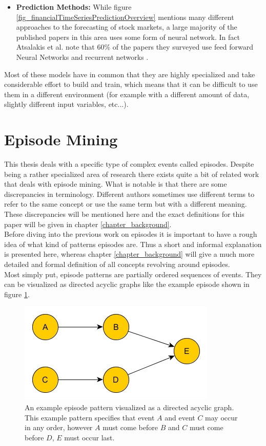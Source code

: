 \begin{itemize}
	\item \textbf{Prediction Methods:} While figure \ref{fig_financialTimeSeriesPredictionOverview} mentions many different approaches to the forecasting of stock markets, a large majority of the published papers in this area uses some form of neural network. In fact Atsalakis et al. note that 60\% of the papers they surveyed use feed forward Neural Networks and recurrent networks \cite{atsalakis2009surveying}. 
\end{itemize}

Most of these models have in common that they are highly specialized and take considerable effort to build and train, which means that it can be difficult to use them in a different environment (for example with a different amount of data, slightly different input variables, etc...).

\section{Episode Mining}
\label{sec_episodes}
This thesis deals with a specific type of complex events called episodes. Despite being a rather specialized area of research there exists quite a bit of related work that deals with episode mining. What is notable is that there are some discrepancies in terminology. Different authors sometimes use different terms to refer to the same concept or use the same term but with  a different meaning. These discrepancies will be mentioned here and the exact definitions for this paper will be given in chapter \ref{chapter_background}. \\
Before diving into the previous work on episodes it is important to have a rough idea of what kind of patterns episodes are. Thus a short and informal explanation is presented here, whereas chapter \ref{chapter_background} will give a much more detailed and formal definition of all concepts revolving around episodes. \\
Most simply put, episode patterns are partially ordered sequences of events. They can be visualized as directed acyclic graphs like the example episode shown in figure \ref{fig_exampleCompositeEpisode}. 

\begin{figure}[h]
	\centering
  	\includegraphics[width=.4\textwidth]{exampleCompositeEpisode}
	\caption{An example episode pattern visualized as a directed acyclic graph. This example pattern specifies that event $A$ and event $C$ may occur in any order, however $A$ must come before $B$ and $C$ must come before $D$, $E$ must occur last.}
	\label{fig_exampleCompositeEpisode}
\end{figure}

